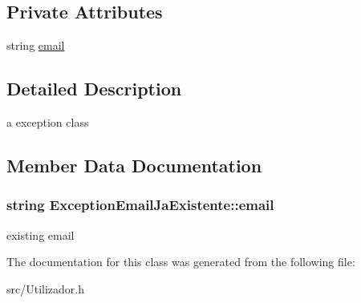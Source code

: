 \subsection*{Private Attributes}
\begin{DoxyCompactItemize}
\item 
string \hyperlink{class_exception_email_ja_existente_a9c23e110acf753bea69fbf3bfce4ae8c}{email}
\end{DoxyCompactItemize}


\subsection{Detailed Description}
a exception class 

\subsection{Member Data Documentation}
\hypertarget{class_exception_email_ja_existente_a9c23e110acf753bea69fbf3bfce4ae8c}{}
\subsubsection[{email}]{\setlength{\rightskip}{0pt plus 5cm}string Exception\+Email\+Ja\+Existente\+::email\hspace{0.3cm}{\ttfamily [private]}}\label{class_exception_email_ja_existente_a9c23e110acf753bea69fbf3bfce4ae8c}
existing email 

The documentation for this class was generated from the following file\+:\begin{DoxyCompactItemize}
\item 
src/Utilizador.\+h\end{DoxyCompactItemize}
